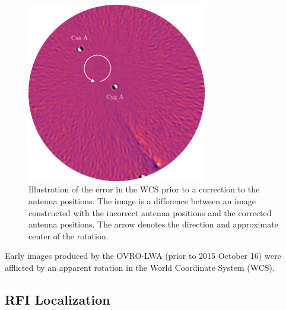 \begin{bibunit}
\begin{figure}
    \centering
    \includegraphics[width=0.7\textwidth]{figures/chapter2/northing-easting-mistake/northing-easting-mistake}
    \caption{
        Illustration of the error in the WCS prior to a correction to the antenna positions. The
        image is a difference between an image constructed with the incorrect antenna positions and
        the corrected antenna positions. The arrow denotes the direction and approximate center of
        the rotation.
    }
    \label{fig:northing-easting-mistake}
\end{figure}

Early images produced by the OVRO-LWA (prior to 2015 October 16) were afflicted by an apparent
rotation in the World Coordinate System (WCS).

\subsection{RFI Localization}


\end{bibunit}
